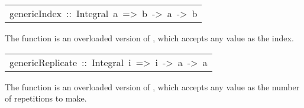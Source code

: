 \begin{haddockdesc}
\item[\begin{tabular}{@{}l}
genericIndex\ ::\ Integral\ a\ =>\ {\char 91}b{\char 93}\ ->\ a\ ->\ b
\end{tabular}]\haddockbegindoc
The  function is an overloaded version of \haddockid{!!}, which
 accepts any  value as the index.
\par

\end{haddockdesc}
\begin{haddockdesc}
\item[\begin{tabular}{@{}l}
genericReplicate\ ::\ Integral\ i\ =>\ i\ ->\ a\ ->\ {\char 91}a{\char 93}
\end{tabular}]\haddockbegindoc
The  function is an overloaded version of ,
 which accepts any  value as the number of repetitions to make.
\par

\end{haddockdesc}